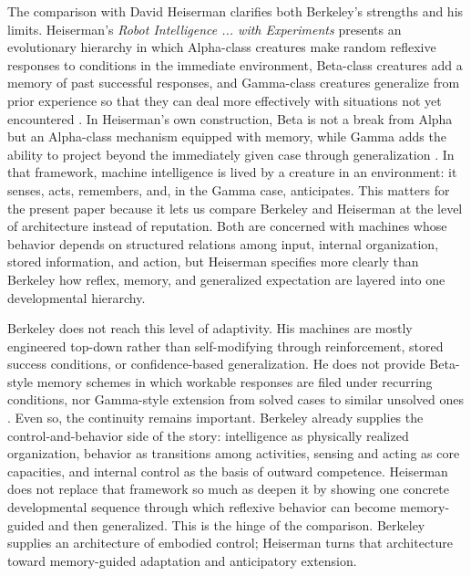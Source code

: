 \documentclass[11pt]{article}
\begin{document}
The comparison with David Heiserman clarifies both Berkeley's strengths and his limits. Heiserman's \emph{Robot Intelligence ... with Experiments} presents an evolutionary hierarchy in which Alpha-class creatures make random reflexive responses to conditions in the immediate environment, Beta-class creatures add a memory of past successful responses, and Gamma-class creatures generalize from prior experience so that they can deal more effectively with situations not yet encountered \citep[pp.~17--20]{heiserman1981robot}. In Heiserman's own construction, Beta is not a break from Alpha but an Alpha-class mechanism equipped with memory, while Gamma adds the ability to project beyond the immediately given case through generalization \citep[pp.~19--20]{heiserman1981robot}. In that framework, machine intelligence is lived by a creature in an environment: it senses, acts, remembers, and, in the Gamma case, anticipates. This matters for the present paper because it lets us compare Berkeley and Heiserman at the level of architecture instead of reputation. Both are concerned with machines whose behavior depends on structured relations among input, internal organization, stored information, and action, but Heiserman specifies more clearly than Berkeley how reflex, memory, and generalized expectation are layered into one developmental hierarchy.

Berkeley does not reach this level of adaptivity. His machines are mostly engineered top-down rather than self-modifying through reinforcement, stored success conditions, or confidence-based generalization. He does not provide Beta-style memory schemes in which workable responses are filed under recurring conditions, nor Gamma-style extension from solved cases to similar unsolved ones \citep[pp.~19--20]{heiserman1981robot}. Even so, the continuity remains important. Berkeley already supplies the control-and-behavior side of the story: intelligence as physically realized organization, behavior as transitions among activities, sensing and acting as core capacities, and internal control as the basis of outward competence. Heiserman does not replace that framework so much as deepen it by showing one concrete developmental sequence through which reflexive behavior can become memory-guided and then generalized. This is the hinge of the comparison. Berkeley supplies an architecture of embodied control; Heiserman turns that architecture toward memory-guided adaptation and anticipatory extension.
\end{document}
